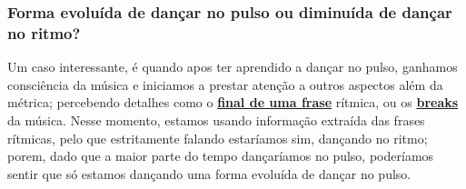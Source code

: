 \subsubsection{Forma evoluída de dançar no pulso ou diminuída de dançar no ritmo?}
Um caso interessante, é quando apos ter aprendido a dançar no pulso,
ganhamos consciência da música e iniciamos a prestar atenção a outros aspectos além da métrica;
percebendo detalhes como o \hyperref[sec:perceberfrases]{\textbf{final de uma frase}} rítmica, 
ou os \hyperref[sec:percepcionbreak]{\textbf{breaks}} da  música.
Nesse momento, estamos usando informação extraída das frases rítmicas, 
pelo que estritamente falando estaríamos sim,  dançando no ritmo; 
porem, dado que a maior parte do tempo dançaríamos no pulso,
 poderíamos sentir que só estamos dançando uma forma evoluída de dançar no pulso.

